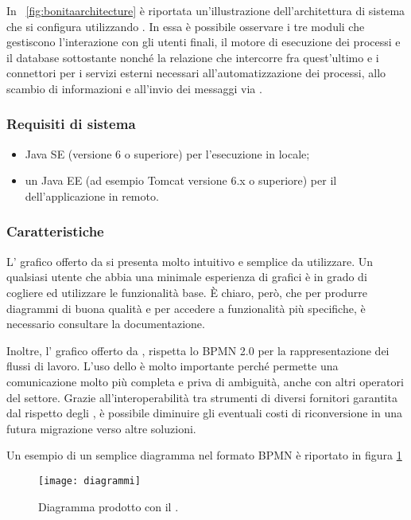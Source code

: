 In \figurename~\ref{fig:bonitaarchitecture} è riportata un'illustrazione dell'architettura di sistema che si configura utilizzando \progname. In essa è possibile osservare i tre moduli che gestiscono l'interazione con gli utenti finali, il motore di esecuzione dei processi e il database sottostante nonché la relazione che intercorre fra quest'ultimo e i connettori per i servizi esterni necessari all'automatizzazione dei processi, allo scambio di informazioni e all'invio dei messaggi via .

\subsubsection{Requisiti di sistema}
\begin{itemize}
  \item Java SE  (versione 6 o superiore) per l'esecuzione in locale;
  \item un  Java EE (ad esempio Tomcat versione 6.x o superiore) per il  dell'applicazione in remoto.
\end{itemize}

\subsubsection{Caratteristiche}
L' grafico offerto da \progname si presenta molto intuitivo e semplice da utilizzare. Un qualsiasi utente che abbia una minimale esperienza di  grafici è in grado di cogliere ed utilizzare le funzionalità base. È chiaro, però, che per produrre diagrammi di buona qualità e per accedere a funzionalità più specifiche, è necessario consultare la documentazione. 

Inoltre, l' grafico offerto da \progname, rispetta lo  BPMN 2.0 per la rappresentazione dei flussi di lavoro. L'uso dello  è molto importante perché permette una comunicazione molto più completa e priva di ambiguità, anche con altri operatori del settore. Grazie all'interoperabilità tra strumenti di diversi fornitori garantita dal rispetto degli , è possibile diminuire gli eventuali costi di riconversione in una futura migrazione verso altre soluzioni.

Un esempio di un semplice diagramma nel formato  BPMN è riportato in figura \ref{fig:diagramma}

\begin{figure}[H]
  \centering
  \texttt{[image: diagrammi]}
  \caption{Diagramma prodotto con il \sw \progname.}
  \label{fig:diagramma}
\end{figure}

